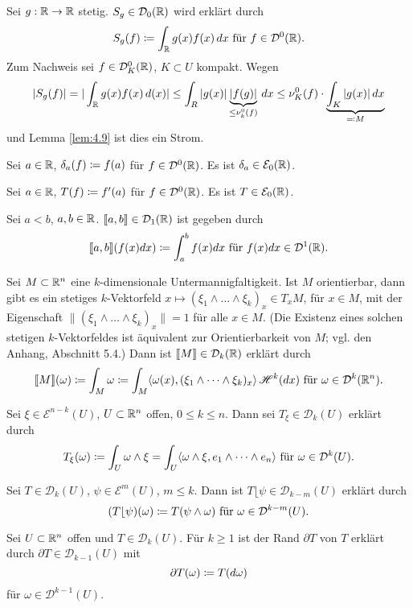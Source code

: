 \documentclass[a4paper,twoside,DIV15,BCOR12mm]{scrbook}
\newcommand{\HM}{\mathscr H}
\newcommand{\MR}{\lfloor}
\begin{document}
\begin{beispiele}
\item Sei $g:\mathbb{R}\to \mathbb{R}$ stetig. $S_g \in \mathcal D_0(\mathbb{R})$ wird erklärt durch
\[
S_g(f) \da \int_\MdR g(x)f(x)\, dx\text{ für } f\in \mathcal D^0(\MdR).
\]
Zum Nachweis sei $f\in \mathcal{D}_K^0(\mathbb{R})$, $K\subset U$ kompakt. Wegen
\[
|S_g(f)| = |\int_\MdR g(x) f(x) \, d(x)| \le \int_R |g(x)|\underbrace{|f(g)|}_{\le \nu_k^0(f)} \, dx \le \nu_K^0(f) \cdot \underbrace{\int_K |g(x)|\, dx}_{\ad M}\]
und Lemma \ref{lem:4.9} ist dies ein Strom.
\item Sei $a\in\mathbb{R}$, $\delta_a(f) \da f(a)$ für $f\in \mathcal D^0(\mathbb{R})$. Es ist $\delta_a\in\mathcal E_0(\mathbb{R})$.
\item Sei $a\in\mathbb{R}$, $T(f) \da f'(a)$ für $f\in\mathcal D^0(\mathbb{R})$. Es ist $T\in \mathcal E_0(\mathbb{R})$.
\item Sei $a< b$, $a,b\in\mathbb{R}$. $\llbracket a,b\rrbracket \in \mathcal D_1(\mathbb{R})$ ist gegeben durch
\[
\llbracket a,b\rrbracket(f(x)dx) \da \int_a^b f(x) dx \text{ für } f(x)dx \in \mathcal D^1(\MdR).
\]
\item Sei $M\subset\mathbb{R}^n$ eine $k$-dimensionale Untermannigfaltigkeit. Ist $M$ orientierbar, dann gibt es ein stetiges $k$-Vektorfeld $x\mapsto (\xi_1\wedge\dots\wedge \xi_k)_x\in T_xM$, für $x\in M$, mit der Eigenschaft $\|(\xi_1\wedge\dots\wedge\xi_k)_x\|=1$ für alle $x\in M$. (Die Existenz eines solchen stetigen $k$-Vektorfeldes ist äquivalent zur Orientierbarkeit von $M$; vgl. den Anhang, Abschnitt 5.4.) Dann ist $\llbracket M\rrbracket \in \mathcal D_k(\mathbb{R})$ erklärt durch
\[
\llbracket M \rrbracket(\omega) \da \int_M \omega \da \int_M \langle \omega(x), (\xi_1\wedge\dots\wedge \xi_k)_x\rangle \,\HM^k(dx) \text{ für } \omega \in \mathcal D^k(\MdR^n).
\]
\item Sei $\xi\in\mathcal E^{n-k}(U)$, $U\subset \mathbb{R}^n$ offen, $0\le k \le n$. Dann sei $T_\xi \in \mathcal D_k(U)$ erklärt durch
\[
T_\xi(\omega) \da \int_U \omega\wedge\xi = \int_U \langle \omega\wedge \xi, e_1\wedge\dots\wedge e_n\rangle  \text{ für }\omega \in \mathcal D^k(U).
\]
\item Sei $T\in \mathcal D_k(U)$, $\psi\in\mathcal E^m(U)$, $m\le k$. Dann ist $T\MR \psi \in \mathcal D_{k-m}(U)$  erklärt durch
\[
(T\MR \psi)(\omega) \da T(\psi \wedge \omega) \text{ für } \omega \in \mathcal D^{k-m}(U).
\]
\end{beispiele}

\begin{definition}
Sei $U\subset \mathbb{R}^n$ offen und $T\in \mathcal D_k(U)$. Für $k\ge 1$ ist der Rand $\partial T$  von $T $ erklärt durch $\partial T\in \mathcal D_{k-1}(U)$ mit 
\[
\partial T(\omega) \da T(d\omega)
\]
für $\omega\in\mathcal D^{k-1}(U)$.
\end{definition}
\end{document}
